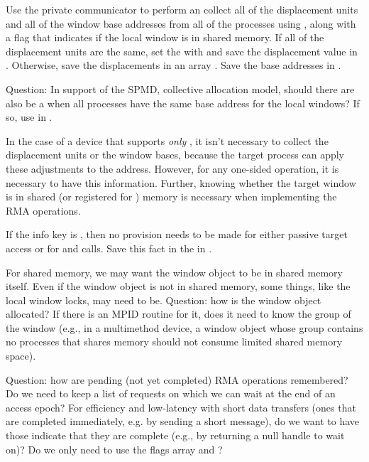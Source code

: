 \documentclass{article}
\begin{document}
Use the private communicator to perform an  
collect all of the displacement units and all of the window base
addresses from all of the processes using ,
along with a flag that indicates if the local window is in shared memory.  
If all of the displacement units are the same, set the
 with  and save
the displacement value in .  Otherwise, save the
displacements in an array .  Save the base
addresses in .  

Question:  In support of the SPMD, collective allocation model, should
there are also be a  when all processes have the same base
address for the local windows?  If so, use
 in .

In the case of a device that supports \emph{only} \tcpname, it isn't
necessary to collect the displacement units or the window bases,
because the target process can apply these adjustments to the
address.  However, for any one-sided operation, it is necessary to
have this information.  Further, knowing whether the target window is
in shared (or registered for \vianame) memory is necessary when
implementing the RMA operations.

If the info key  is ,
then no provision needs to be made for either passive target access or for
 and  calls.  Save this
fact in the  in .

For shared memory, we may want the window object to be in shared
memory itself.  Even if the window object is not in shared memory,
some things, like the local window locks, may need to be.  Question:
how is the window object allocated?  If there is an MPID routine for
it, does it need to know the group of the window (e.g., in a
multimethod device, a window object whose group contains no processes
that shares memory should not consume limited shared memory space).

Question: how are pending (not yet completed) RMA operations
remembered?  Do we need to keep a list of requests on which we can
wait at the end of an access epoch?  For efficiency and low-latency
with short data transfers (ones that are completed immediately,
e.g. by sending a short message), do we want to have those indicate
that they are complete (e.g., by returning a null handle to wait on)?
Do we only need to use the flags array and ?
\end{document}
